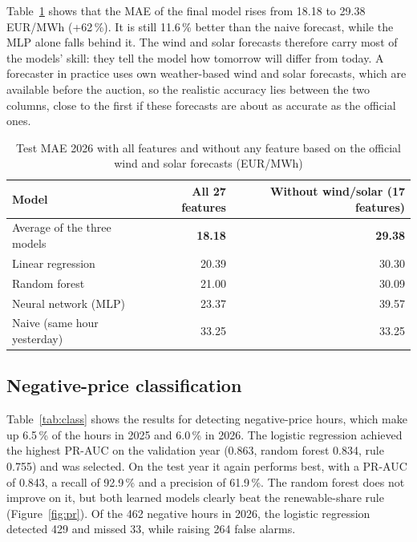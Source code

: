 \documentclass[12pt,oneside]{article}
\begin{document}
Table~\ref{tab:robust} shows that the MAE of the final model rises from 18.18 to 29.38\,EUR/MWh (+62\,\%). It is still 11.6\,\% better than the naive forecast, while the MLP alone falls behind it. The wind and solar forecasts therefore carry most of the models' skill: they tell the model how tomorrow will differ from today. A forecaster in practice uses own weather-based wind and solar forecasts, which are available before the auction, so the realistic accuracy lies between the two columns, close to the first if these forecasts are about as accurate as the official ones.

\begin{table}[!htbp]
    \centering
    \caption{Test MAE 2026 with all features and without any feature based on the official wind and solar forecasts (EUR/MWh)}
    \begin{tabular}{lrr}
        \toprule
        Model & All 27 features & Without wind/solar (17 features) \\
        \midrule
        Average of the three models & \textbf{18.18} & \textbf{29.38} \\
        Linear regression & 20.39 & 30.30 \\
        Random forest & 21.00 & 30.09 \\
        Neural network (MLP) & 23.37 & 39.57 \\
        Naive (same hour yesterday) & 33.25 & 33.25 \\
        \bottomrule
    \end{tabular}
    \label{tab:robust}
\end{table}

\subsection{Negative-price classification}

Table~\ref{tab:class} shows the results for detecting negative-price hours, which make up 6.5\,\% of the hours in 2025 and 6.0\,\% in 2026. The logistic regression achieved the highest PR-AUC on the validation year (0.863, random forest 0.834, rule 0.755) and was selected. On the test year it again performs best, with a PR-AUC of 0.843, a recall of 92.9\,\% and a precision of 61.9\,\%. The random forest does not improve on it, but both learned models clearly beat the renewable-share rule (Figure~\ref{fig:pr}). Of the 462 negative hours in 2026, the logistic regression detected 429 and missed 33, while raising 264 false alarms.
\end{document}
